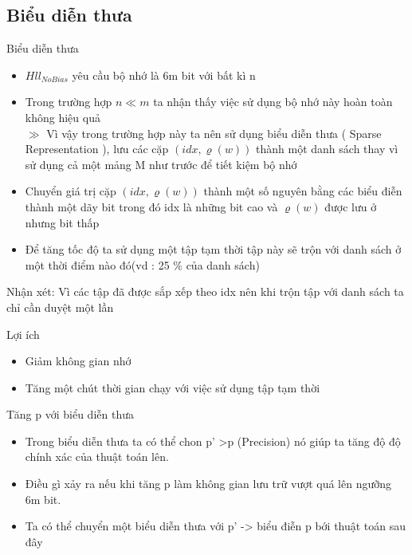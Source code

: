 \documentclass{beamer}
\newcommand{\bi}{\begin{itemize}}
\newcommand{\ei}{\end{itemize}}
\begin{document}
\subsection{Biểu diễn thưa}
\begin{frame}{Biểu diễn thưa}
\bi
\item $Hll_{NoBias} $ yêu cầu bộ nhớ là 6m bit với bất kì n  \\
\item Trong trường hợp $n\ll m $ ta nhận thấy việc sử dụng bộ nhớ này hoàn toàn không hiệu quả \\
$ \gg$ Vì vậy trong trường hợp này ta nên sử dụng biểu diễn thưa ( Sparse Representation ), lưu các cặp $(idx,\varrho(w)) $ thành một danh sách thay vì sử dụng cả một mảng M như trước để tiết kiệm bộ nhớ\\
\item Chuyển giá trị cặp $(idx,\varrho(w)) $ thành một số nguyên bằng các biểu điễn thành một dãy bit trong đó idx là những bit cao và $\varrho(w) $ được lưu ở nhưng bit thấp\\
\ei
\end{frame}
\begin{frame}{}
\bi

\item Để tăng tốc độ ta sử dụng một tập tạm thời tập này sẽ trộn với danh sách ở một thời điểm nào đó(vd : 25 $\%$ của danh sách) \\


\ei
{\color{hilight} Nhận xét:} Vì các tập đã được sắp xếp theo idx nên khi trộn tập với danh sách ta chỉ cần duyệt một lần
\end{frame}
\begin{frame}{Lợi ích }
\begin{itemize}
\item Giảm không gian nhớ
\item Tăng một chút thời gian chạy với việc sử dụng tập tạm thời
\end{itemize}
\end{frame}
\begin{frame}{Tăng p với biểu diễn thưa} 
\bi
\item Trong biểu diễn thưa ta có thể chon p' >p (Precision) nó giúp ta tăng độ  độ chính xác của thuật toán lên.\\

\item Điều gì xảy ra nếu khi tăng p làm không gian lưu trữ vượt quá lên ngưỡng 6m bit.\\
\item Ta có thể chuyển một biểu diễn thưa với p' -> biểu điễn p bới thuật toán sau đây
\ei 
\end{frame}
\end{document}
